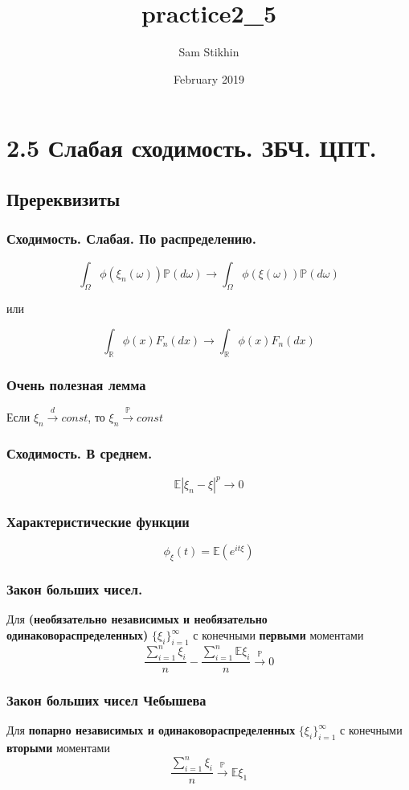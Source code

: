 \documentclass[a4paper, 14pt]{extarticle}
\title{practice2_5}
\author{Sam Stikhin}
\date{February 2019}
\begin{document}
\section*{2.5 Слабая сходимость. ЗБЧ. ЦПТ.}
\subsection*{Пререквизиты}
\subsubsection*{Сходимость. Слабая. По распределению.}
$$\int_{\Omega}\phi(\xi_n(\omega))\mathbb{P}(d\omega) \to \int_{\Omega}\phi(\xi(\omega))\mathbb{P}(d\omega)$$

или

$$\int_{\mathbb{R}}\phi(x)F_n(dx) \to \int_{\mathbb{R}}\phi(x)F_n(dx)$$

\subsubsection*{Очень полезная лемма}
Если $\xi_n \overset{d}{\to} const$, то $\xi_n \overset{\mathbb{P}}{\to} const$

\subsubsection*{Сходимость. В среднем.}
$$\mathbb{E}|\xi_n - \xi|^p \to 0$$

\subsubsection*{Характеристические функции}
$$\phi_\xi(t) = \mathbb{E}(e^{it\xi})$$

\subsubsection*{Закон больших чисел.}
Для \textbf{(необязательно независимых и необязательно одинаковораспределенных)} 
$\{\xi_i\}_{i=1}^{\infty}$ с конечными \textbf{первыми} моментами
$$\frac{\sum_{i=1}^n\xi_i}{n} - \frac{\sum_{i=1}^n\mathbb{E}\xi_i}{n} \overset{\mathbb{P}}{\to} 0$$

\subsubsection*{Закон больших чисел Чебышева}
Для \textbf{попарно независимых и одинаковораспределенных} 
$\{\xi_i\}_{i=1}^{\infty}$ с конечными \textbf{вторыми} моментами
$$\frac{\sum_{i=1}^n\xi_i}{n} \overset{\mathbb{P}}{\to} \mathbb{E}\xi_1$$	
\end{document}
